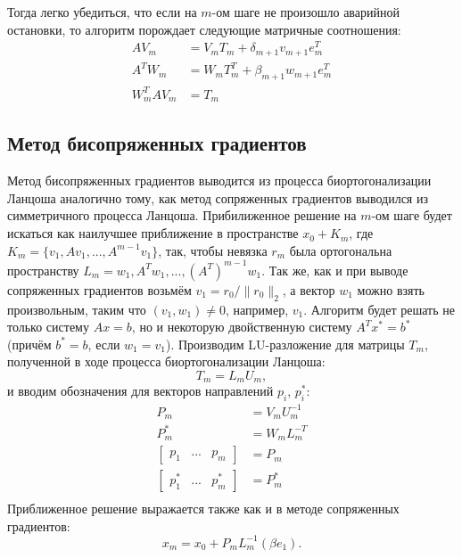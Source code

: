 Тогда легко убедиться, что если на $m$-ом шаге не произошло аварийной остановки, 
то алгоритм порождает следующие матричные соотношения:
\begin{align*}
    AV_m &= V_m T_m + \delta_{m+1} v_{m+1} e_m^T\\
    A^T W_m &= W_m T^T_m + \beta_{m+1} w_{m+1} e_m^T \\
    W_m^T A V_m &= T_m  
\end{align*}

\subsection[Метод бисопряженных градиентов]{Метод бисопряженных градиентов \cite{Saad2003}}
\par Метод бисопряженных градиентов выводится из процесса биортогонализации Ланцоша
аналогично тому, как метод сопряженных градиентов выводился из симметричного процесса
Ланцоша. Прибилиженное решение на $m$-ом шаге будет искаться как наилучшее приближение в 
пространстве $x_0 + K_m$, где $K_m = \{v_1, Av_1,...,A^{m-1}v_1\}$, так, чтобы невязка 
$r_m$ была ортогональна пространству $L_m = {w_1,A^T w_1, ... ,(A^T)^{m-1} w_1}$. Так же, 
как и при выводе сопряженных градиентов возьмём $v_1 = r_0 / \| r_0 \|_2$, а вектор 
$w_1$ можно взять произвольным, таким что $(v_1, w_1) \neq 0$, например, $v_1$. Алгоритм
будет решать не только систему $Ax=b$, но и некоторую двойственную систему $A^T x^* = b^*$ (причём
 $b^*=b$, если $w_1 = v_1$).
Производим LU-разложение для матрицы $T_m$, полученной в ходе процесса биортогонализации Ланцоша:
\begin{equation*}
    T_m = L_m U_m,
\end{equation*}
и вводим обозначения для векторов направлений $p_i$, $p_i^*$:
\begin{align*}
    P_m &= V_m U_m^{-1} \\
    P_m^* &= W_m L_m^{-T} \\
    \begin{bmatrix} p_1 & ... & p_m \end{bmatrix} &= P_m \\
    \begin{bmatrix} p_1^* & ... & p_m^* \end{bmatrix} &= P_m^* \\
\end{align*} 
Приближенное решение выражается также как и в методе сопряженных градиентов:
\begin{equation*}
    x_m = x_0 + P_m L_m^{-1} (\beta e_1).
\end{equation*}
